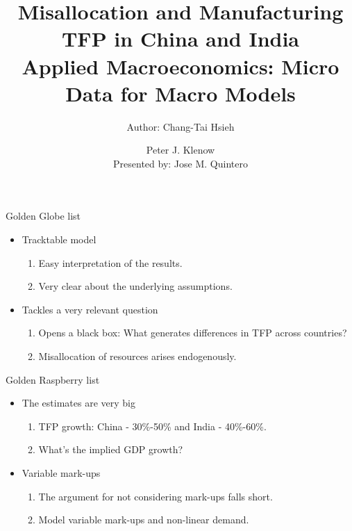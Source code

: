 \documentclass[usenames,dvipsnames,aspectratio=169]{beamer}
\title{Misallocation and Manufacturing TFP in China and India \\ \small{Applied Macroeconomics: Micro Data for Macro Models} }
\author{Author: Chang-Tai Hsieh \and Peter J. Klenow \\ Presented by: Jose M. Quintero}
\begin{document}
\begin{frame}
  \titlepage
\end{frame}

\begin{frame}{Golden Globe list}
\begin{itemize}[label=\textcolor{teal}{$\blacktriangleright$}]
    \item Tracktable model 
    \begin{enumerate}[label=\textbf{\textcolor{teal}{\arabic*.}}]
        \item Easy interpretation of the results.
        \item Very clear about the underlying assumptions. 
    \end{enumerate}
    \vfill
    \item Tackles a very relevant question 
    \begin{enumerate}[label=\textbf{\textcolor{teal}{\arabic*.}}]
        \item Opens a black box: What generates differences in TFP across countries?
        \item Misallocation of resources arises endogenously. 
    \end{enumerate}
\end{itemize}
\end{frame}

\begin{frame}{Golden Raspberry list}
     \begin{itemize}[label=\textcolor{teal}{$\blacktriangleright$}]
         \item The estimates are very big
         \begin{enumerate}[label=\textbf{\textcolor{teal}{\arabic*.}}]
             \item TFP growth: China - 30\%-50\% and India - 40\%-60\%. 
             \item What's the implied GDP growth?
         \end{enumerate}
         \vfill
         \item Variable mark-ups
         \begin{enumerate}[label=\textbf{\textcolor{teal}{\arabic*.}}]
             \item The argument for not considering mark-ups falls short. 
             \item Model variable mark-ups and non-linear demand. 
         \end{enumerate}
     \end{itemize}
\end{frame}
\end{document}
